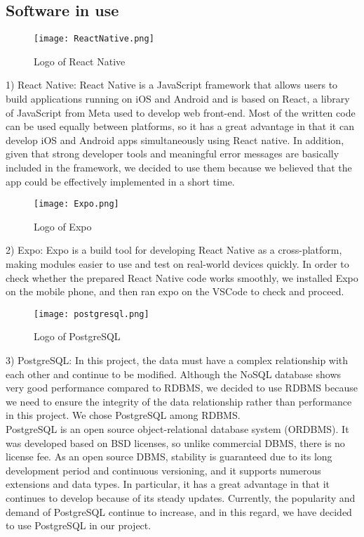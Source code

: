 \documentclass[conference]{IEEEtran}
\begin{document}
\subsection{Software in use}
\begin{figure}[htbp]
\centerline{\texttt{[image: ReactNative.png]}}
\label{fig}
\caption{Logo of React Native}
\end{figure}
1) React Native: React Native is a JavaScript framework that allows users to build applications running on iOS and Android and is based on React, a library of JavaScript from Meta used to develop web front-end. Most of the written code can be used equally between platforms, so it has a great advantage in that it can develop iOS and Android apps simultaneously using React native. In addition, given that strong developer tools and meaningful error messages are basically included in the framework, we decided to use them because we believed that the app could be effectively implemented in a short time.\\

\begin{figure}[htbp]
\centerline{\texttt{[image: Expo.png]}}
\label{fig}
\caption{Logo of Expo}
\end{figure}
2) Expo: Expo is a build tool for developing React Native as a cross-platform, making modules easier to use and test on real-world devices quickly. In order to check whether the prepared React Native code works smoothly, we installed Expo on the mobile phone, and then ran expo on the VSCode to check and proceed.\\

\begin{figure}[htbp]
\centerline{\texttt{[image: postgresql.png]}}
\label{fig}
\caption{Logo of PostgreSQL}
\end{figure}
3) PostgreSQL: In this project, the data must have a complex relationship with each other and continue to be modified. Although the NoSQL database shows very good performance compared to RDBMS, we decided to use RDBMS because we need to ensure the integrity of the data relationship rather than performance in this project. We chose PostgreSQL among RDBMS.\\
PostgreSQL is an open source object-relational database system (ORDBMS). It was developed based on BSD licenses, so unlike commercial DBMS, there is no license fee. As an open source DBMS, stability is guaranteed due to its long development period and continuous versioning, and it supports numerous extensions and data types. In particular, it has a great advantage in that it continues to develop because of its steady updates. Currently, the popularity and demand of PostgreSQL continue to increase, and in this regard, we have decided to use PostgreSQL in our project.\\
\end{document}
